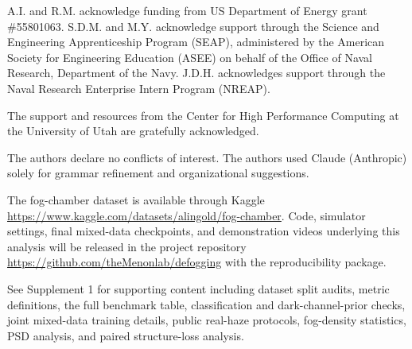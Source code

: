 \documentclass{optica-article}
\begin{document}
\begin{backmatter}
 A.I. and R.M. acknowledge funding from US Department of Energy grant \#55801063. S.D.M. and M.Y. acknowledge support through the Science and Engineering Apprenticeship Program (SEAP), administered by the American Society for Engineering Education (ASEE) on behalf of the Office of Naval Research, Department of the Navy. J.D.H. acknowledges support through the Naval Research Enterprise Intern Program (NREAP). 

 The support and resources from the Center for High Performance Computing at the University of Utah are gratefully acknowledged.

 The authors declare no conflicts of interest. The authors used Claude (Anthropic) solely for grammar refinement and organizational suggestions. 

 The fog-chamber dataset is available
through Kaggle
\url{https://www.kaggle.com/datasets/alingold/fog-chamber}. Code,
simulator settings, final mixed-data checkpoints, and demonstration
videos underlying this analysis will be released in the project
repository
\url{https://github.com/theMenonlab/defogging} with the
reproducibility package.

See Supplement 1 for supporting content including dataset split audits, metric definitions, the full benchmark table, classification and dark-channel-prior checks, joint mixed-data training details, public real-haze protocols, fog-density statistics, PSD analysis, and paired structure-loss analysis.

\end{backmatter}


\end{document}
